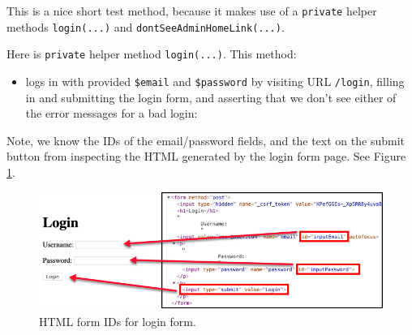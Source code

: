 \documentclass[a4paperpaper,openright]{book}
\newenvironment{Shaded}{}{}
\newcommand{\CommentTok}[1]{\textcolor[rgb]{0.38,0.63,0.69}{\textit{#1}}}
\newcommand{\KeywordTok}[1]{\textcolor[rgb]{0.00,0.44,0.13}{\textbf{#1}}}
\newcommand{\NormalTok}[1]{#1}
\newcommand{\OtherTok}[1]{\textcolor[rgb]{0.00,0.44,0.13}{#1}}
\newcommand{\StringTok}[1]{\textcolor[rgb]{0.25,0.44,0.63}{#1}}
\providecommand{\tightlist}{%
  \setlength{\itemsep}{0pt}\setlength{\parskip}{0pt}}
\begin{document}
This is a nice short test method, because it makes use of a
\texttt{private} helper methods \texttt{login(...)} and
\texttt{dontSeeAdminHomeLink(...)}.

Here is \texttt{private} helper method \texttt{login(...)}. This method:

\begin{itemize}
\tightlist
\item
  logs in with provided \texttt{\$email} and \texttt{\$password} by
  visiting URL \texttt{/login}, filling in and submitting the login
  form, and asserting that we don't see either of the error messages for
  a bad login:
\end{itemize}

\begin{Shaded}
\end{Shaded}

Note, we know the IDs of the email/password fields, and the text on the
submit button from inspecting the HTML generated by the login form page.
See Figure \ref{loginIds}.

\begin{figure}
\centering
\includegraphics{./tex2pdf.-8aed53dcd332a606/995637c50831a7ce3f68e1aa8c8a4db770df590e.png}
\caption{HTML form IDs for login form.\label{loginIds}}
\end{figure}
\end{document}

